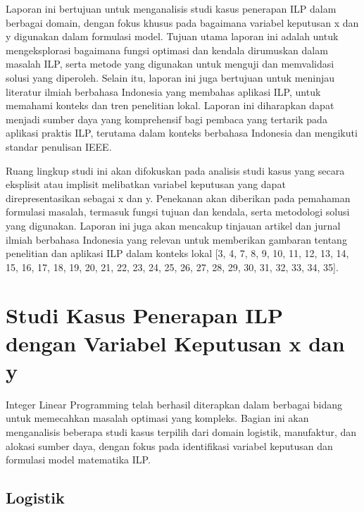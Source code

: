 \documentclass{IEEEtran}
\begin{document}
Laporan ini bertujuan untuk menganalisis studi kasus penerapan ILP dalam berbagai domain, dengan fokus khusus pada bagaimana variabel keputusan x dan y digunakan dalam formulasi model. Tujuan utama laporan ini adalah untuk mengeksplorasi bagaimana fungsi optimasi dan kendala dirumuskan dalam masalah ILP, serta metode yang digunakan untuk menguji dan memvalidasi solusi yang diperoleh. Selain itu, laporan ini juga bertujuan untuk meninjau literatur ilmiah berbahasa Indonesia yang membahas aplikasi ILP, untuk memahami konteks dan tren penelitian lokal. Laporan ini diharapkan dapat menjadi sumber daya yang komprehensif bagi pembaca yang tertarik pada aplikasi praktis ILP, terutama dalam konteks berbahasa Indonesia dan mengikuti standar penulisan IEEE.

Ruang lingkup studi ini akan difokuskan pada analisis studi kasus yang secara eksplisit atau implisit melibatkan variabel keputusan yang dapat direpresentasikan sebagai x dan y. Penekanan akan diberikan pada pemahaman formulasi masalah, termasuk fungsi tujuan dan kendala, serta metodologi solusi yang digunakan. Laporan ini juga akan mencakup tinjauan artikel dan jurnal ilmiah berbahasa Indonesia yang relevan untuk memberikan gambaran tentang penelitian dan aplikasi ILP dalam konteks lokal [3, 4, 7, 8, 9, 10, 11, 12, 13, 14, 15, 16, 17, 18, 19, 20, 21, 22, 23, 24, 25, 26, 27, 28, 29, 30, 31, 32, 33, 34, 35].

\section{Studi Kasus Penerapan ILP dengan Variabel Keputusan x dan y}

Integer Linear Programming telah berhasil diterapkan dalam berbagai bidang untuk memecahkan masalah optimasi yang kompleks. Bagian ini akan menganalisis beberapa studi kasus terpilih dari domain logistik, manufaktur, dan alokasi sumber daya, dengan fokus pada identifikasi variabel keputusan dan formulasi model matematika ILP.

\subsection{Logistik}
\end{document}
